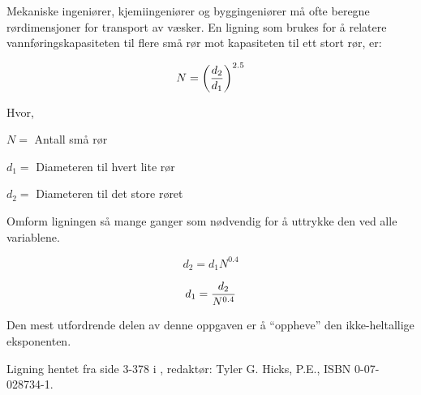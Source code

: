 

Mekaniske ingeniører, kjemiingeniører og byggingeniører må ofte beregne rørdimensjoner for transport av væsker. En ligning som brukes for å relatere vannføringskapasiteten til flere små rør mot kapasiteten til ett stort rør, er:

$$N = \biggl({d_2 \over d_1}\biggr)^{2.5}$$

\noindent
Hvor,

$N =$ Antall små rør

$d_1 =$ Diameteren til hvert lite rør

$d_2 =$ Diameteren til det store røret

\vskip 10pt

Omform ligningen så mange ganger som nødvendig for å uttrykke den ved alle variablene.







$$d_2 = d_1 N^{0.4}$$

$$d_1 = {d_2 \over N^{0.4}}$$







Den mest utfordrende delen av denne oppgaven er å ``oppheve'' den ikke-heltallige eksponenten.

\vskip 10pt

Ligning hentet fra side 3-378 i , redaktør: Tyler G. Hicks, P.E., ISBN 0-07-028734-1.



